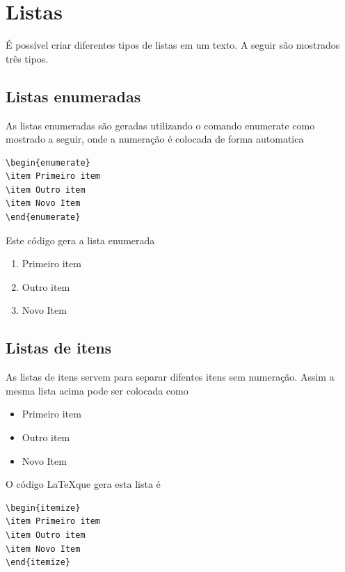 \section{Listas}

É possível criar diferentes tipos de listas em um texto. A seguir são mostrados
três tipos.

\subsection{Listas enumeradas}

As listas enumeradas são geradas utilizando o comando enumerate como mostrado a
seguir, onde a numeração é colocada de forma automatica

\begin{verbatim}
\begin{enumerate}
\item Primeiro item 
\item Outro item 
\item Novo Item
\end{enumerate} 
\end{verbatim}


Este código gera a lista enumerada 

\begin{enumerate}
\item Primeiro item 
\item Outro item 
\item Novo Item
\end{enumerate}

\subsection{Listas de itens}

As listas de itens servem para separar difentes itens sem numeração. Assim a
mesma lista acima pode ser colocada como 

\begin{itemize}
\item Primeiro item 
\item Outro item 
\item Novo Item
\end{itemize}


O código \LaTeX que gera esta lista é 

\begin{verbatim}
\begin{itemize}
\item Primeiro item 
\item Outro item 
\item Novo Item
\end{itemize} 
\end{verbatim}




